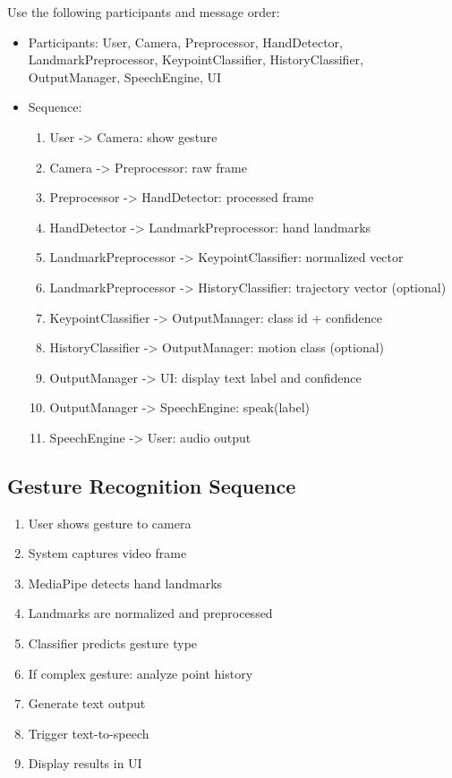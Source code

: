 Use the following participants and message order:
\begin{itemize}
    \item Participants: User, Camera, Preprocessor, HandDetector, LandmarkPreprocessor, KeypointClassifier, HistoryClassifier, OutputManager, SpeechEngine, UI
    \item Sequence:
    \begin{enumerate}
        \item User -> Camera: show gesture
        \item Camera -> Preprocessor: raw frame
        \item Preprocessor -> HandDetector: processed frame
        \item HandDetector -> LandmarkPreprocessor: hand landmarks
        \item LandmarkPreprocessor -> KeypointClassifier: normalized vector
        \item LandmarkPreprocessor -> HistoryClassifier: trajectory vector (optional)
        \item KeypointClassifier -> OutputManager: class id + confidence
        \item HistoryClassifier -> OutputManager: motion class (optional)
        \item OutputManager -> UI: display text label and confidence
        \item OutputManager -> SpeechEngine: speak(label)
        \item SpeechEngine -> User: audio output
    \end{enumerate}
\end{itemize}

\subsection{Gesture Recognition Sequence}

\begin{enumerate}
    \item User shows gesture to camera
    \item System captures video frame
    \item MediaPipe detects hand landmarks
    \item Landmarks are normalized and preprocessed
    \item Classifier predicts gesture type
    \item If complex gesture: analyze point history
    \item Generate text output
    \item Trigger text-to-speech
    \item Display results in UI
\end{enumerate}

